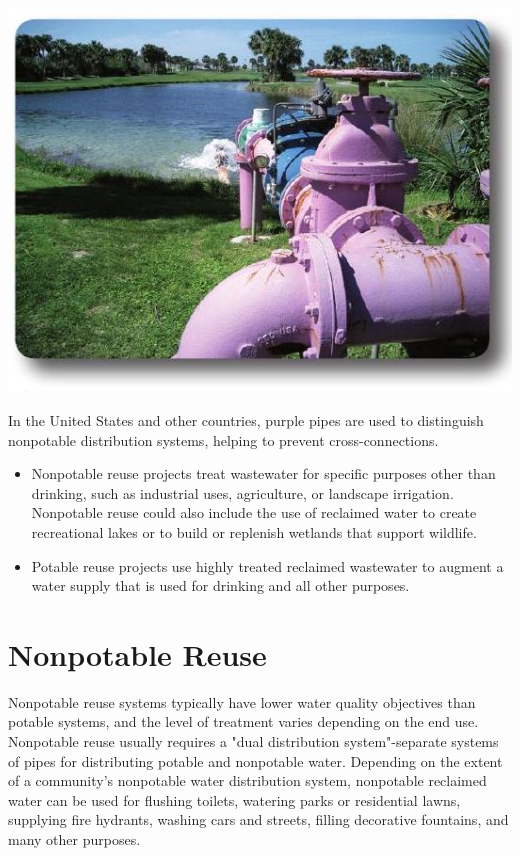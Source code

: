 \documentclass[10pt]{article}
\begin{document}
\includegraphics[max width=\textwidth]{2022_11_05_93277ca2de7ec5580550g-02}

In the United States and other countries, purple pipes are used to distinguish nonpotable distribution systems, helping to prevent cross-connections.

\begin{itemize}
  \item Nonpotable reuse projects treat wastewater for specific purposes other than drinking, such as industrial uses, agriculture, or landscape irrigation. Nonpotable reuse could also include the use of reclaimed water to create recreational lakes or to build or replenish wetlands that support wildlife.

  \item Potable reuse projects use highly treated reclaimed wastewater to augment a water supply that is used for drinking and all other purposes.

\end{itemize}
\section{Nonpotable Reuse}
Nonpotable reuse systems typically have lower water quality objectives than potable systems, and the level of treatment varies depending on the end use. Nonpotable reuse usually requires a "dual distribution system"-separate systems of pipes for distributing potable and nonpotable water. Depending on the extent of a community's nonpotable water distribution system, nonpotable reclaimed water can be used for flushing toilets, watering parks or residential lawns, supplying fire hydrants, washing cars and streets, filling decorative fountains, and many other purposes.
\end{document}
